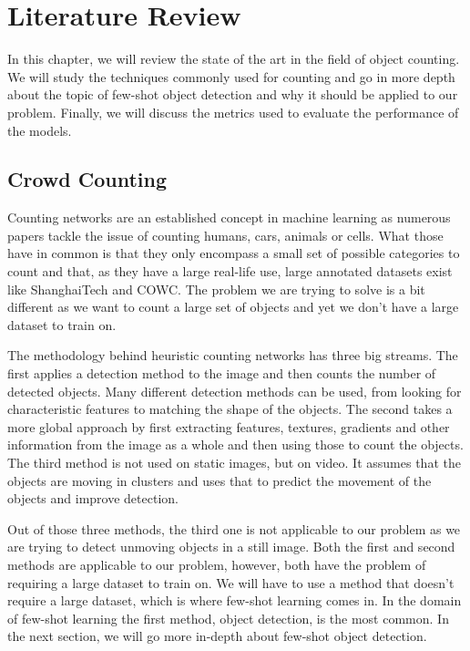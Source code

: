 
\chapter{Literature Review}
In this chapter, we will review the state of the art in the field of object counting. We will study the techniques commonly used for counting and go in more depth about the topic of few-shot object detection and why it should be applied to our problem. Finally, we will discuss the metrics used to evaluate the performance of the models.

\section{Crowd Counting}
Counting networks are an established concept in machine learning as numerous papers tackle the issue of counting humans, cars, animals or cells. What those have in common is that they only encompass a small set of possible categories to count and that, as they have a large real-life use, large annotated datasets exist like ShanghaiTech\cite{Shanghaitech} and COWC\cite{COWC}. The problem we are trying to solve is a bit different as we want to count a large set of objects and yet we don't have a large dataset to train on.

The methodology behind heuristic counting networks has three big streams\cite{s22145286}. The first applies a detection method to the image and then counts the number of detected objects. Many different detection methods can be used, from looking for characteristic features to matching the shape of the objects. The second takes a more global approach by first extracting features, textures, gradients and other information from the image as a whole and then using those to count the objects. The third method is not used on static images, but on video. It assumes that the objects are moving in clusters and uses that to predict the movement of the objects and improve detection.

Out of those three methods, the third one is not applicable to our problem as we are trying to detect unmoving objects in a still image.
Both the first and second methods are applicable to our problem, however, both have the problem of requiring a large dataset to train on. We will have to use a method that doesn't require a large dataset, which is where few-shot learning comes in. In the domain of few-shot learning the first method, object detection, is the most common. In the next section, we will go more in-depth about few-shot object detection.

